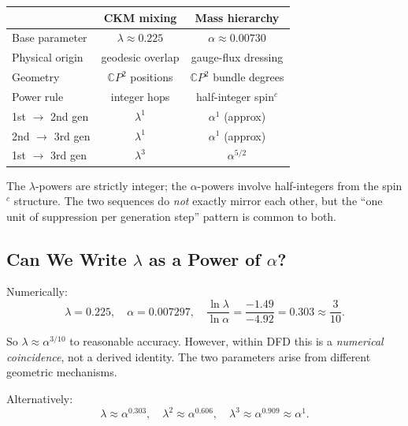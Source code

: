 \documentclass[11pt]{article}
\newcommand{\CP}{\mathbb{C}P}
\theoremstyle{remark}
\begin{document}
\begin{tcolorbox}[colback=green!5!white, colframe=green!60!black,
  title=Parallel Structure]
\begin{center}
\begin{tabular}{lcc}
& \textbf{CKM mixing} & \textbf{Mass hierarchy} \\
\midrule
Base parameter & $\lambda \approx 0.225$ & $\alpha \approx 0.00730$ \\
Physical origin & geodesic overlap & gauge-flux dressing \\
Geometry & $\CP^2$ positions & $\CP^2$ bundle degrees \\
Power rule & integer hops & half-integer spin$^c$ \\
1st $\to$ 2nd gen & $\lambda^1$ & $\alpha^{1}$ (approx) \\
2nd $\to$ 3rd gen & $\lambda^1$ & $\alpha^{1}$ (approx) \\
1st $\to$ 3rd gen & $\lambda^3$ & $\alpha^{5/2}$ \\
\end{tabular}
\end{center}
The $\lambda$-powers are strictly integer; the $\alpha$-powers
involve half-integers from the spin$^c$ structure. The two sequences
do \emph{not} exactly mirror each other, but the ``one unit of
suppression per generation step'' pattern is common to both.
\end{tcolorbox}

\subsection{Can We Write $\lambda$ as a Power of $\alpha$?}

Numerically:
\begin{equation}
\lambda = 0.225, \quad \alpha = 0.007297, \quad
\frac{\ln\lambda}{\ln\alpha} = \frac{-1.49}{-4.92} = 0.303 \approx \frac{3}{10}.
\end{equation}

So $\lambda \approx \alpha^{3/10}$ to reasonable accuracy.
However, within DFD this is a \emph{numerical coincidence},
not a derived identity. The two parameters arise from different
geometric mechanisms.

Alternatively:
\begin{equation}
\lambda \approx \alpha^{0.303}, \quad
\lambda^2 \approx \alpha^{0.606}, \quad
\lambda^3 \approx \alpha^{0.909} \approx \alpha^1.
\end{equation}
\end{document}
